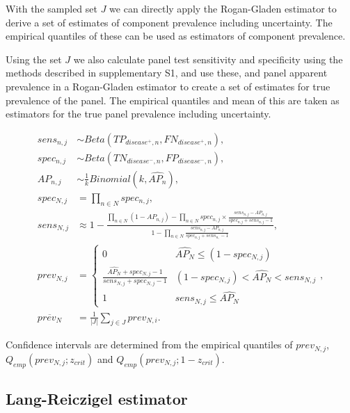 \documentclass[a4paper, 12pt, twoside]{article}
\let\Oldsubsection\subsection
\renewcommand{\subsection}{\FloatBarrier\Oldsubsection}
\begin{document}
With the sampled set \(J\) we can directly apply the Rogan-Gladen estimator to derive a set of estimates of component prevalence including uncertainty. The empirical quantiles of these can be used as estimators of component prevalence.

Using the set \(J\) we also calculate panel test sensitivity and specificity using the methods described in supplementary S1, and use these, and panel apparent prevalence in a Rogan-Gladen estimator \cite{rogan1978} to create a set of estimates for true prevalence of the panel. The empirical quantiles and mean of this are taken as estimators for the true panel prevalence including uncertainty.

\begin{equation*}
\begin{aligned}
sens_{n,j} &\sim Beta(TP_{disease^+,n}, FN_{disease^+,n}), \\
spec_{n,j} &\sim Beta(TN_{disease^-,n}, FP_{disease^-,n}), \\
AP_{n,j} &\sim \frac{1}{k}Binomial(k, \widehat{AP_n}), \\
spec_{N,j} &= \prod_{n \in N}{spec_{n,j}}, \\
sens_{N,j} &\approx 1-\frac{
  \prod_{n \in N}{(1-AP_{n,j})} - \prod_{n \in N}{spec_{n,j} \times \frac{sens_{n,j}-AP_{n,j}}{spec_{n,j} + sens_{n,j} - 1}}
}{
  1 - \prod_{n \in N}{ \frac{sens_{n,j}-AP_{n,j}}{spec_{n,j} + sens_{n,} - 1} }
}, \\
prev_{N,j} &= \begin{cases}
    0 & \widehat{AP_N} \le (1-spec_{N,j})\\
    \frac{\widehat{AP_N} + spec_{N,j} -1}{sens_{N,j} + spec_{N,j} - 1} & (1-spec_{N,j}) < \widehat{AP_N} < sens_{N,j}\\
    1 & sens_{N,j} \le \widehat{AP_N}
  \end{cases}, \\
\overline{prev_N} &= \frac{1}{|J|}\sum_{j \in J}{prev_{N,i}}.
\end{aligned}
\end{equation*}

Confidence intervals are determined from the empirical quantiles of \(prev_{N,j}\), \(Q_{emp}(prev_{N,j};z_{crit})\) and \(Q_{emp}(prev_{N,j};1-z_{crit})\).

\subsection{Lang-Reiczigel estimator}
\end{document}

